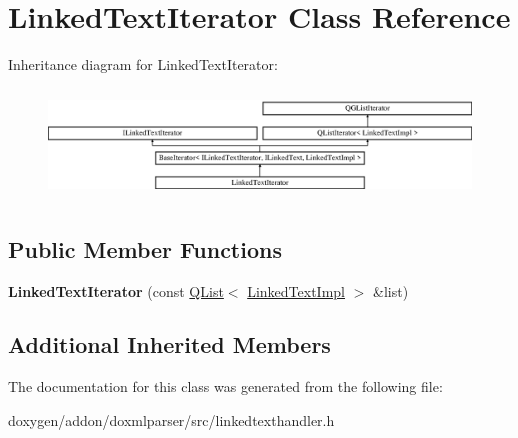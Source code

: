 \hypertarget{class_linked_text_iterator}{}\section{Linked\+Text\+Iterator Class Reference}
\label{class_linked_text_iterator}
Inheritance diagram for Linked\+Text\+Iterator\+:\begin{figure}[H]
\begin{center}
\leavevmode
\includegraphics[height=2.962963cm]{class_linked_text_iterator}
\end{center}
\end{figure}
\subsection*{Public Member Functions}
\begin{DoxyCompactItemize}
\item 
\mbox{\label{class_linked_text_iterator_ad0449fa374170ef1f253b15ecd98200b}} 
{\bfseries Linked\+Text\+Iterator} (const \mbox{\hyperlink{class_q_list}{Q\+List}}$<$ \mbox{\hyperlink{class_linked_text_impl}{Linked\+Text\+Impl}} $>$ \&list)
\end{DoxyCompactItemize}
\subsection*{Additional Inherited Members}


The documentation for this class was generated from the following file\+:\begin{DoxyCompactItemize}
\item 
doxygen/addon/doxmlparser/src/linkedtexthandler.\+h\end{DoxyCompactItemize}
